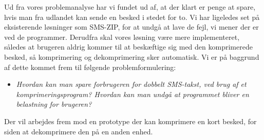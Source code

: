 Ud fra vores problemanalyse har vi fundet ud af, at der klart er penge at spare, hvis man fra udlandet kan sende en besked i stedet for to. Vi har ligeledes set på eksisterende løsninger som SMS-ZIP, for at undgå at lave de fejl, vi mener der er ved de programmer. Derudfra skal vores løsning være mere implementeret, således at brugeren aldrig kommer til at beskæftige sig med den komprimerede besked, så komprimering og dekomprimering sker automatisk. Vi er på baggrund af dette kommet frem til følgende problemformulering:

\begin{itemize}
\item[] \emph{Hvordan kan man spare forbrugeren for dobbelt SMS-takst, ved brug af et komprimeringsprogram? Hvordan kan man undgå at programmet bliver en belastning for brugeren?}
\end{itemize}

Der vil arbejdes frem mod en prototype der kan komprimere en kort besked, for siden at dekomprimere den på en anden enhed. 
